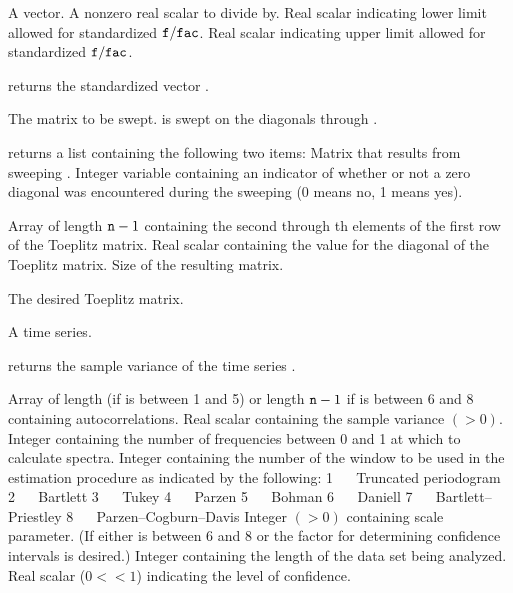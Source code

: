 
\Sarg
{} A vector.
 A nonzero real scalar to divide {} by.
 Real scalar indicating lower limit allowed for standardized 
${\tt{f}}/{\tt{fac}}$.
 Real scalar indicating upper limit allowed for standardized
${\tt{f}}/{\tt{fac}}$. 

\Sval
\Sitem{ }  returns the standardized vector {}.
%
%


\Sarg
{} The matrix to be swept.
 {} is swept on the diagonals {} through 
{}.

\Sval
\Sitem{ }  returns a list containing the following two items:
 Matrix that results from sweeping {}.
 Integer variable containing an indicator of whether or not a zero 
diagonal was encountered during the sweeping (0 means no, 1 means yes).
%
%


\Sarg
{} Array of length ${\tt{n}}-1$ containing the second through 
{}th elements of the first row of the Toeplitz matrix.
 Real scalar containing the value for the diagonal of the Toeplitz 
matrix.
 Size of the resulting matrix.

\Sval
{} The desired Toeplitz matrix.
%
%


\Sarg
{} A time series.

\Sval
\Sitem{ }  returns the sample variance of the time series {}.
%
%


\Sarg
{} Array of length {} (if {} is between 1 and 5) or 
length ${\tt{n}}-1$ if {} is between 6 and 8 containing 
autocorrelations.
 Real scalar containing the sample variance $(>0)$.
 Integer containing the number of frequencies between 0 
and 1 at which to calculate spectra.
 Integer containing the number of the window to be used in the 
estimation procedure as indicated by the following:
\Sitem{ }1 ~~ Truncated periodogram
\Sitem{ }2 ~~ Bartlett
\Sitem{ }3 ~~ Tukey
\Sitem{ }4 ~~ Parzen
\Sitem{ }5 ~~ Bohman
\Sitem{ }6 ~~ Daniell
\Sitem{ }7 ~~ Bartlett--Priestley
\Sitem{ }8 ~~ Parzen--Cogburn--Davis
 Integer $(>0)$ containing scale parameter.
 (If either {} is between 6 and 8 or the factor for 
determining confidence intervals is desired.) Integer containing the length 
of the data set being analyzed.
 Real scalar ($0<${}$<1$) indicating the level
of confidence.

